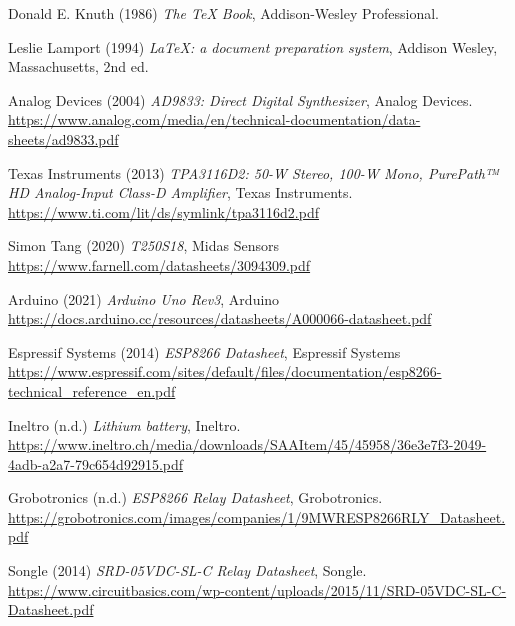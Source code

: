 \begin{thebibliography}{9}
Donald E. Knuth (1986) \emph{The \TeX{} Book}, Addison-Wesley Professional.

Leslie Lamport (1994) \emph{\LaTeX: a document preparation system}, Addison
Wesley, Massachusetts, 2nd ed.
    
Analog Devices (2004) \emph{AD9833: Direct Digital Synthesizer}, Analog Devices.
\url{https://www.analog.com/media/en/technical-documentation/data-sheets/ad9833.pdf}

Texas Instruments (2013) \emph{TPA3116D2: 50-W Stereo, 100-W Mono, PurePath™ HD Analog-Input Class-D Amplifier}, Texas Instruments.
\url{https://www.ti.com/lit/ds/symlink/tpa3116d2.pdf}

Simon Tang (2020) \emph{T250S18}, Midas Sensors
\url{https://www.farnell.com/datasheets/3094309.pdf}

Arduino (2021) \emph{Arduino Uno Rev3}, Arduino
\url{https://docs.arduino.cc/resources/datasheets/A000066-datasheet.pdf}

Espressif Systems (2014) \emph{ESP8266 Datasheet}, Espressif Systems
\url{https://www.espressif.com/sites/default/files/documentation/esp8266-technical_reference_en.pdf}

Ineltro (n.d.) \emph{Lithium battery}, Ineltro.
\url{https://www.ineltro.ch/media/downloads/SAAItem/45/45958/36e3e7f3-2049-4adb-a2a7-79c654d92915.pdf}

Grobotronics (n.d.) \emph{ESP8266 Relay Datasheet}, Grobotronics.
\url{https://grobotronics.com/images/companies/1/9MWRESP8266RLY_Datasheet.pdf}

Songle (2014) \emph{SRD-05VDC-SL-C Relay Datasheet}, Songle.
\url{https://www.circuitbasics.com/wp-content/uploads/2015/11/SRD-05VDC-SL-C-Datasheet.pdf}


\end{thebibliography}